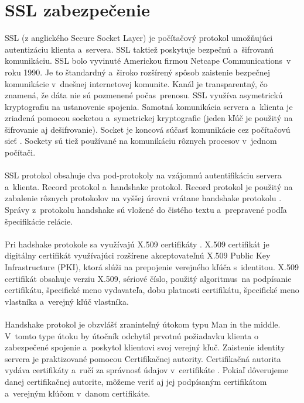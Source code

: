 \documentclass[
  digital, %
  table,   %
oneside,
  nolof,     %
  nolot,     %
]{fithesis3}
\begin{document}
\section{SSL zabezpečenie}
SSL (z anglického Secure Socket Layer) \cite{ssl}\cite{sslOnline} je počítačový protokol umožňujúci autentizáciu  klienta a~servera. SSL taktiež  poskytuje  bezpečnú a~šifrovanú komunikáciu. SSL bolo vyvinuté Americkou firmou Netcape Communications~v roku 1990. Je to štandardný a~široko rozšírený spôsob zaistenie bezpečnej komunikácie v~dnešnej internetovej komunite. Kanál je transparentný, čo znamená, že dáta nie sú pozmenené počas~prenosu. SSL využíva asymetrickú kryptografiu  na ustanovenie spojenia. Samotná komunikácia servera a~klienta je zriadená pomocou socketou a~symetrickej kryptografie (jeden kľúč je použitý na šifrovanie aj dešifrovanie). Socket je koncová súčasť komunikácie cez počítačovú sieť \cite{networkSocket}. Sockety sú tiež používané na komunikáciu rôznych procesov v~jednom počítači. \paragraph{}
SSL protokol obsahuje dva pod-protokoly na vzájomnú autentifikáciu servera a~klienta. Record protokol a~handshake protokol. Record protokol je použitý na zabalenie rôznych protokolov na vyššej úrovni vrátane handshake protokolu \cite{ssl3.0}. Správy z~protokolu handshake  sú vložené do čistého textu a~prepravené podľa špecifikácie relácie. \paragraph{}
Pri hadshake protokole sa využívajú X.509 certifikáty \cite{x509cert}. X.509 certifikát je digitálny certifikát využívajúci rozšírene akceptovateľnú X.509 Public Key Infrastructure (PKI), ktorá slúži na prepojenie verejného kľúča s~identitou.  X.509 certifikát obsahuje verziu X.509, sériové číslo, použitý algoritmus~na podpísanie certifikátu, špecifické meno vydavateľa, dobu platnosti certifikátu, špecifické meno vlastníka a~verejný kľúč vlastníka.  
\paragraph{}
Handshake protokol je obzvlášť zraninteľný  útokom typu Man in the middle. V~tomto type útoku by útočník odchytil prvotnú požiadavku klienta o zabezpečené spojenie a~poskytol klientovi svoj verejný kľuč. Zaistenie identity servera je praktizované pomocou Certifikačnej autority.  Certifikačná autorita vydáva certifikáty a~ručí za správnosť údajov v~certifikáte \cite{certificateAuth}. Pokiaľ dôverujeme danej certifikačnej autorite, môžeme veriť aj jej podpísaným certifikátom  a~verejným kľúčom v~danom certifikáte. 
\end{document}

